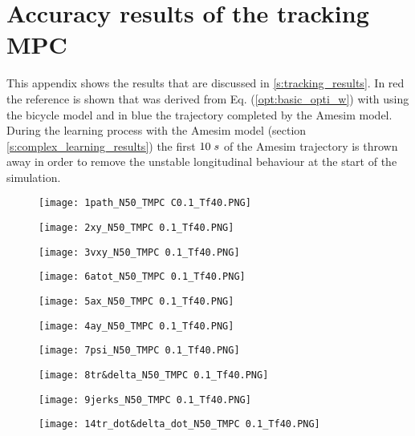 \chapter{Accuracy results of the tracking MPC}
\label{app:D}
This appendix shows the results that are discussed in \ref{s:tracking_results}. In red the reference is shown that was derived from Eq. (\ref{opt:basic_opti_w}) with using the bicycle model and in blue the trajectory completed by the Amesim model. During the learning process with the Amesim model (section \ref{s:complex_learning_results}) the first $10 \hspace{1mm}s$ of the Amesim trajectory is thrown away in order to remove the unstable longitudinal behaviour at the start of the simulation.


\begin{figure}[h!]
	\centering
	\texttt{[image: 1path\_N50\_TMPC C0.1\_Tf40.PNG]}
\end{figure}

\begin{figure}[h!]
	\centering
	\texttt{[image: 2xy\_N50\_TMPC 0.1\_Tf40.PNG]}
\end{figure}

\begin{figure}[h!]
	\centering
	\texttt{[image: 3vxy\_N50\_TMPC 0.1\_Tf40.PNG]}
\end{figure}


\begin{figure}[h!]
	\centering
	\texttt{[image: 6atot\_N50\_TMPC 0.1\_Tf40.PNG]}
\end{figure}


\begin{figure}[h!]
	\centering
	\texttt{[image: 5ax\_N50\_TMPC 0.1\_Tf40.PNG]}
\end{figure}

\begin{figure}[h!]
	\centering
	\texttt{[image: 4ay\_N50\_TMPC 0.1\_Tf40.PNG]}
\end{figure}

\begin{figure}[h!]
	\centering
	\texttt{[image: 7psi\_N50\_TMPC 0.1\_Tf40.PNG]}
\end{figure}

\begin{figure}[h!]
	\centering
	\texttt{[image: 8tr\&delta\_N50\_TMPC 0.1\_Tf40.PNG]}
\end{figure}

\begin{figure}[h!]
	\centering
	\texttt{[image: 9jerks\_N50\_TMPC 0.1\_Tf40.PNG]}
\end{figure}

\begin{figure}[h!]
	\centering
	\texttt{[image: 14tr\_dot\&delta\_dot\_N50\_TMPC 0.1\_Tf40.PNG]}
\end{figure}




